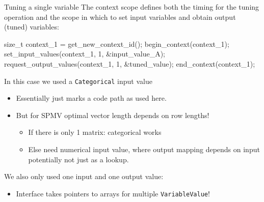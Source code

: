 \begin{frame}[fragile]{Tuning a single variable}
The context scope defines both the timing for the tuning operation and the scope in which to set input variables and obtain output (tuned) variables:

\begin{code}[keywords={get_new_context_id,begin_context,end_context,set_inpute_values,request_output_values,set_input_values}]
size_t context_1 = get_new_context_id();
begin_context(context_1);
set_input_values(context_1, 1, &input_value_A);
request_output_values(context_1, 1, &tuned_value);
end_context(context_1);
\end{code}

\pause
In this case we used a \texttt{Categorical} input value
\begin{itemize}
  \item Essentially just marks a code path as used here.
  \item But for SPMV optimal vector length depends on row lengths!
  \begin{itemize}
    \item If there is only 1 matrix: categorical works
    \item Else need numerical input value, where output mapping depends on input potentially not just as a lookup.
  \end{itemize}
\end{itemize}

\pause
We also only used one input and one output value:
\begin{itemize}
	\item Interface takes pointers to arrays for multiple \texttt{VariableValue}!
\end{itemize}
\end{frame}


